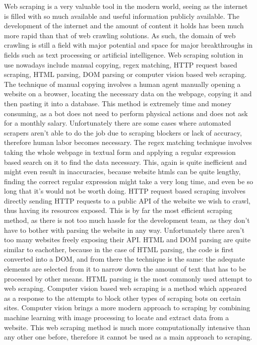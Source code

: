 \documentclass[12pt,a4paper,twoside]{report}
\begin{document}
Web scraping is a very valuable tool in the modern world, seeing as the internet is filled with so much available and useful information publicly available. The development of the internet and the amount of content it holds has been much more rapid than that of web crawling solutions. As such, the domain of web crawling is still a field with major potential and space for major breakthroughs in fields such as text processing or artificial intelligence. Web scraping solution in use nowadays include manual copying, regex matching, HTTP request based scraping, HTML parsing, DOM parsing or computer vision based web scraping. The technique of manual copying involves a human agent manually opening a website on a browser, locating the necessary data on the webpage, copying it and then pasting it into a database. This method is extremely time and money consuming, as a bot does not need to perform physical actions and does not ask for a monthly salary. Unfortunately there are some cases where automated scrapers aren't able to do the job due to scraping blockers or lack of accuracy, therefore human labor becomes necessary. The regex matching technique involves taking the whole webpage in textual form and applying a regular expression based search on it to find the data necessary. This, again is quite inefficient and might even result in inaccuracies, because website htmls can be quite lengthy, finding the correct regular expression might take a very long time, and even be so long that it's would not be worth doing. HTTP request based scraping involves directly sending HTTP requests to a public API of the website we wish to crawl, thus having its resources exposed. This is by far the most efficient scraping method, as there is not too much hassle for the development team, as they don't have to bother with parsing the website in any way. Unfortunately there aren't too many websites freely exposing their API. HTML and DOM parsing are quite similar to eachother, because in the case of HTML parsing, the code is first converted into a DOM, and from there the technique is the same: the adequate elements are selected from it to narrow down the amount of text that has to be processed by other means. HTML parsing is the most commonly used attempt to web scraping. Computer vision based web scraping is a method which appeared as a response to the attempts to block other types of scraping bots on certain sites. Computer vision brings a more modern approach to scraping by combining machine learning with image processing to locate and extract data from a website. This web scraping method is much more computationally intensive than any other one before, therefore it cannot be used as a main approach to scraping.
\end{document}
